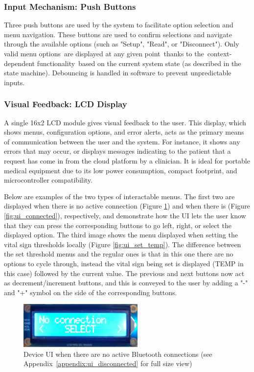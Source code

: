 \subsubsection{Input Mechanism: Push Buttons}
Three push buttons are used by the system to facilitate option selection and menu navigation. These buttons are used to confirm selections and navigate through the available options (such as "Setup", "Read", or "Disconnect"). Only valid menu options are displayed at any given point thanks to the context-dependent functionality based on the current system state (as described in the state machine). Debouncing is handled in software to prevent unpredictable inputs.

\subsubsection{Visual Feedback: LCD Display}
A single 16x2 LCD module gives visual feedback to the user. This display, which shows menus, configuration options, and error alerts, acts as the primary means of communication between the user and the system. For instance, it shows any errors that may occur, or displays messages indicating to the patient that a request has come in from the cloud platform by a clinician. It is ideal for portable medical equipment due to its low power consumption, compact footprint, and microcontroller compatibility.

Below are examples of the two types of interactable menus. The first two are displayed when there is no active connection (Figure \ref{fig:ui_disconnected}) and when there is (Figure \ref{fig:ui_connected}), respectively, and demonstrate how the UI lets the user know that they can press the corresponding buttons to go left, right, or select the displayed option. The third image shows the menu displayed when setting the vital sign thresholds locally (Figure \ref{fig:ui_set_temp}). The difference between the set threshold menus and the regular ones is that in this one there are no options to cycle through, instead the vital sign being set is displayed (TEMP in this case) followed by the current value. The previous and next buttons now act as decrement/increment buttons, and this is conveyed to the user by adding a "-" and "+" symbol on the side of the corresponding buttons.

\begin{figure}[H]
	\centering
	\includegraphics[width=0.55\textwidth]{images/device_ui_disconnected}
	\caption{Device UI when there are no active Bluetooth connections (see Appendix~\ref{appendix:ui_disconnected} for full size view)}
	\label{fig:ui_disconnected}
\end{figure}

